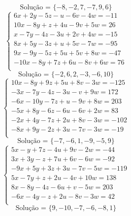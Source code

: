 \documentclass[12pt,oneside,a4paper]{article}
\begin{document}
\begin{equation*}
\text{Solução = }\{-8,-2,7,-7,9,6\}
\end{equation*}
\vspace{\baselineskip}
\begin{equation*}
\begin{cases}
6x+2y-5z-u-6v-4w=-11 \\
10x-8y+z+4u-9v+5w=26 \\
x-7y-4z-3u+2v+4w=-15 \\
8x+5y-3z+u+5v-7w=-95 \\
9x-9y-5z+5u+5v+8w=-47 \\
-10x-8y+7z+6u-8v+6w=76 \\
\end{cases}
\end{equation*}
\begin{equation*}
\text{Solução = }\{-2,6,2,-3,-6,10\}
\end{equation*}
\vspace{\baselineskip}
\begin{equation*}
\begin{cases}
10x-8y+9z+5u+8v-3w=-125 \\
-3x-7y-4z-3u-v+9w=172 \\
-6x-10y-7z+u-9v+8w=203 \\
-5x+8y-6z-6u-6v+2w=83 \\
-2x+4y-7z+2u+8v-3w=-102 \\
-8x+9y-2z+3u-7v-3w=-19 \\
\end{cases}
\end{equation*}
\begin{equation*}
\text{Solução = }\{-7,-6,1,-9,-5,9\}
\end{equation*}
\vspace{\baselineskip}
\begin{equation*}
\begin{cases}
5x-y+7z-4u+9v-2w=-44 \\
3x+3y-z+7u+6v-6w=-92 \\
-9x+5y+3z+3u-7v-5w=-119 \\
5x-7y+z+2u-4v+10w=138 \\
8x-8y-4z-6u+v-5w=203 \\
-6x-4y-z+2u-8v-3w=42 \\
\end{cases}
\end{equation*}
\begin{equation*}
\text{Solução = }\{9,-10,-7,-6,-8,1\}
\end{equation*}
\end{document}
